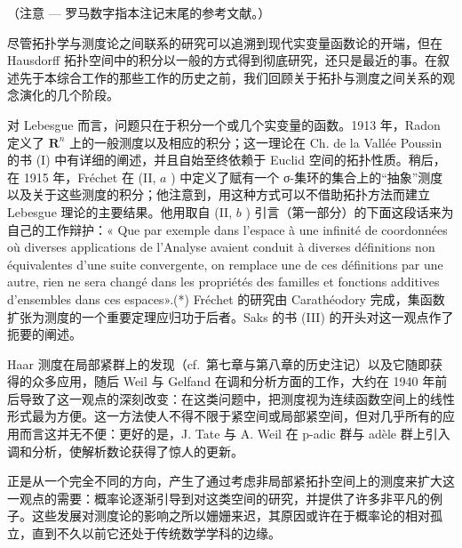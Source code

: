 
（注意 --- 罗马数字指本注记末尾的参考文献。）

尽管拓扑学与测度论之间联系的研究可以追溯到现代实变量函数论的开端，但在 Hausdorff 拓扑空间中的积分以一般的方式得到彻底研究，还只是最近的事。在叙述先于本综合工作的那些工作的历史之前，我们回顾关于拓扑与测度之间关系的观念演化的几个阶段。

对 Lebesgue 而言，问题只在于积分一个或几个实变量的函数。1913 年，Radon 定义了 \(\mathbf{R}^n\) 上的一般测度以及相应的积分；这一理论在 Ch. de la Vallée Poussin 的书 (I) 中有详细的阐述，并且自始至终依赖于 Euclid 空间的拓扑性质。稍后，在 1915 年，Fréchet 在 (II, \(a\) ) 中定义了赋有一个 σ-集环的集合上的“抽象”测度以及关于这些测度的积分；他注意到，用这种方式可以不借助拓扑方法而建立 Lebesgue 理论的主要结果。他用取自 (II, \(b\) ) 引言（第一部分）的下面这段话来为自己的工作辩护：« Que par exemple dans l'espace à une infinité de coordonnées où diverses applications de l'Analyse avaient conduit à diverses définitions non équivalentes d'une suite convergente, on remplace une de ces définitions par une autre, rien ne sera changé dans les propriétés des familles et fonctions additives d'ensembles dans ces espaces».(*) Fréchet 的研究由 Carathéodory 完成，集函数扩张为测度的一个重要定理应归功于后者。Saks 的书 (III) 的开头对这一观点作了扼要的阐述。

Haar 测度在局部紧群上的发现（cf.~第七章与第八章的历史注记）以及它随即获得的众多应用，随后 Weil 与 Gelfand 在调和分析方面的工作，大约在 1940 年前后导致了这一观点的深刻改变：在这类问题中，把测度视为连续函数空间上的线性形式最为方便。这一方法使人不得不限于紧空间或局部紧空间，但对几乎所有的应用而言这并无不便：更好的是，J. Tate 与 A. Weil 在 p-adic 群与 adèle 群上引入调和分析，使解析数论获得了惊人的更新。

正是从一个完全不同的方向，产生了通过考虑非局部紧拓扑空间上的测度来扩大这一观点的需要：概率论逐渐引导到对这类空间的研究，并提供了许多非平凡的例子。这些发展对测度论的影响之所以姗姗来迟，其原因或许在于概率论的相对孤立，直到不久以前它还处于传统数学学科的边缘。

